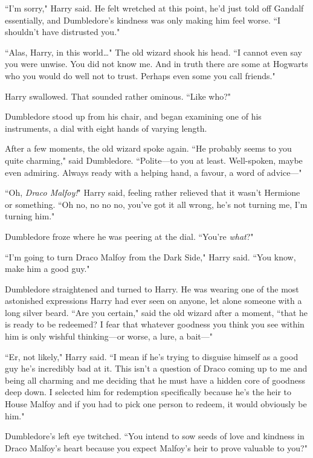 ``I'm sorry," Harry said. He felt wretched at this point, he'd just told off Gandalf essentially, and Dumbledore's kindness was only making him feel worse. ``I shouldn't have distrusted you."

``Alas, Harry, in this world{\ldots}" The old wizard shook his head. ``I cannot even say you were unwise. You did not know me. And in truth there are some at Hogwarts who you would do well not to trust. Perhaps even some you call friends."

Harry swallowed. That sounded rather ominous. ``Like who?"

Dumbledore stood up from his chair, and began examining one of his instruments, a dial with eight hands of varying length.

After a few moments, the old wizard spoke again. ``He probably seems to you quite charming," said Dumbledore. ``Polite—to you at least. Well-spoken, maybe even admiring. Always ready with a helping hand, a favour, a word of advice—"

``Oh, \emph{Draco Malfoy!}" Harry said, feeling rather relieved that it wasn't Hermione or something. ``Oh no, no no no, you've got it all wrong, he's not turning me, I'm turning him."

Dumbledore froze where he was peering at the dial. ``You're \emph{what}?"

``I'm going to turn Draco Malfoy from the Dark Side," Harry said. ``You know, make him a good guy."

Dumbledore straightened and turned to Harry. He was wearing one of the most astonished expressions Harry had ever seen on anyone, let alone someone with a long silver beard. ``Are you certain," said the old wizard after a moment, ``that he is ready to be redeemed? I fear that whatever goodness you think you see within him is only wishful thinking—or worse, a lure, a bait—"

``Er, not likely," Harry said. ``I mean if he's trying to disguise himself as a good guy he's incredibly bad at it. This isn't a question of Draco coming up to me and being all charming and me deciding that he must have a hidden core of goodness deep down. I selected him for redemption specifically because he's the heir to House Malfoy and if you had to pick one person to redeem, it would obviously be him."

Dumbledore's left eye twitched. ``You intend to sow seeds of love and kindness in Draco Malfoy's heart because you expect Malfoy's heir to prove valuable to you?"

